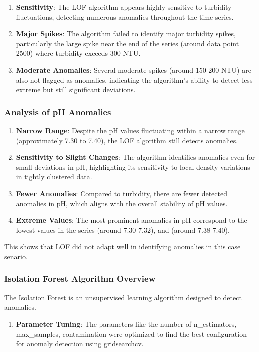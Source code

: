 \documentclass[12pt]{report}
\begin{document}
\begin{enumerate}
    \item \textbf{Sensitivity}: The LOF algorithm appears highly sensitive to turbidity fluctuations, detecting numerous anomalies throughout the time series.

    \item \textbf{Major Spikes}: The algorithm failed to  identify major turbidity spikes, particularly the large spike near the end of the series (around data point 2500) where turbidity exceeds 300 NTU.

    \item \textbf{Moderate Anomalies}: Several moderate spikes (around 150-200 NTU) are also not  flagged as anomalies, indicating the algorithm's ability to detect less extreme but still significant deviations.
\end{enumerate}
\subsubsection{Analysis of pH Anomalies}

\begin{enumerate}
    \item \textbf{Narrow Range}: Despite the pH values fluctuating within a narrow range (approximately 7.30 to 7.40), the LOF algorithm still detects anomalies.

    \item \textbf{Sensitivity to Slight Changes}: The algorithm identifies anomalies even for small deviations in pH, highlighting its sensitivity to local density variations in tightly clustered data.

    \item \textbf{Fewer Anomalies}: Compared to turbidity, there are fewer detected anomalies in pH, which aligns with the overall stability of pH values.

    \item \textbf{Extreme Values}: The most prominent anomalies in pH correspond to the lowest values in the series (around 7.30-7.32), and  (around 7.38-7.40).
\end{enumerate}
This  shows  that LOF  did not adapt well in identifying  anomalies  in this  case  senario.
\subsubsection{Isolation Forest Algorithm Overview}
The Isolation Forest is an unsupervised learning algorithm designed to detect anomalies.
\begin{enumerate}

    \item \textbf{Parameter Tuning}: The parameters like the number of n\_estimators, max\_samples, contamination were optimized to find the best configuration for anomaly detection using  gridsearchcv. 
\end{enumerate}
\end{document}
